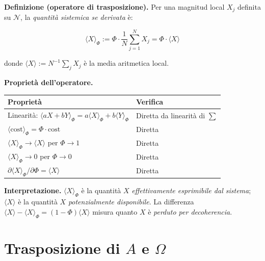 \Hypoth{} \textbf{Definizione (operatore di trasposizione).} Per una
magnitud local \(X_j\) definita su \(\mathcal{N}\), la \emph{quantità
sistemica se derivata} è:

\[
\langle X \rangle_\Phi := \Phi \cdot \frac{1}{N} \sum_{j=1}^{N} X_j = \Phi \cdot \langle X \rangle
\]

donde \(\langle X \rangle := N^{-1} \sum_j X_j\) è la media aritmetica
local.

\Proved{} \textbf{Proprietà dell'operatore.}

{\def\LTcaptype{none} %
{\small\begin{longtable}[]{@{}
  >{\raggedright\arraybackslash}p{}
  >{\raggedright\arraybackslash}p{}@{}}
\toprule\noalign{}
\begin{minipage}[b]{\linewidth}\raggedright
Proprietà
\end{minipage} & \begin{minipage}[b]{\linewidth}\raggedright
Verifica
\end{minipage} \\
\midrule\noalign{}
\endhead
\bottomrule\noalign{}
\endlastfoot
Linearità:
\(\langle aX + bY \rangle_\Phi = a\langle X\rangle_\Phi + b\langle Y\rangle_\Phi\)
& Diretta da linearità di \(\sum\) \\
\(\langle\text{cost}\rangle_\Phi = \Phi \cdot \text{cost}\) & Diretta \\
\(\langle X \rangle_\Phi \to \langle X \rangle\) per \(\Phi \to 1\) &
Diretta \\
\(\langle X \rangle_\Phi \to 0\) per \(\Phi \to 0\) & Diretta \\
\(\partial \langle X \rangle_\Phi / \partial \Phi = \langle X \rangle\)
& Diretta \\
\end{longtable}}
}

\Hypoth{} \textbf{Interpretazione.} \(\langle X \rangle_\Phi\) è la
quantità \(X\) \emph{effettivamente esprimibile dal sistema};
\(\langle X \rangle\) è la quantità \(X\) \emph{potenzialmente
disponibile}. La differenza
\(\langle X \rangle - \langle X \rangle_\Phi = (1-\Phi)\langle X \rangle\)
misura quanto \(X\) è \emph{perduto per decoherencia}.



\section{\texorpdfstring{Trasposizione di \(A\) e
\(\Omega\)}{Trasposizione di A e \textbackslash Omega}}\label{trasposizione-di-a-e-omega}

